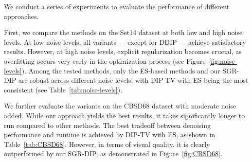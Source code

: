 We conduct a series of experiments to evaluate the performance of different approaches.

First, we compare the methods on the Set14 dataset at both low and high noise levels.
At low noise levels, all variants --- except for DDIP --- achieve satisfactory results.
However, at high noise levels, explicit regularization becomes crucial, as overfitting occurs very early in the optimization process (see Figure~\ref{fig:noise-levels}).
Among the tested methods, only the ES-based methods and our SGR-DIP are robust across different noise levels, with DIP-TV with ES being the most consistent (see Table~\ref{tab:noise-levels}).

We further evaluate the variants on the CBSD68 dataset with moderate noise added.
While our approach yields the best results, it takes significantly longer to run compared to other methods.
The best tradeoff between denoising performance and runtime is achieved by DIP-TV with ES, as shown in Table~\ref{tab:CBSD68}.
However, in terms of visual quality, it is clearly outperformed by our SGR-DIP, as demonstrated in Figure~\ref{fig:CBSD68}.

